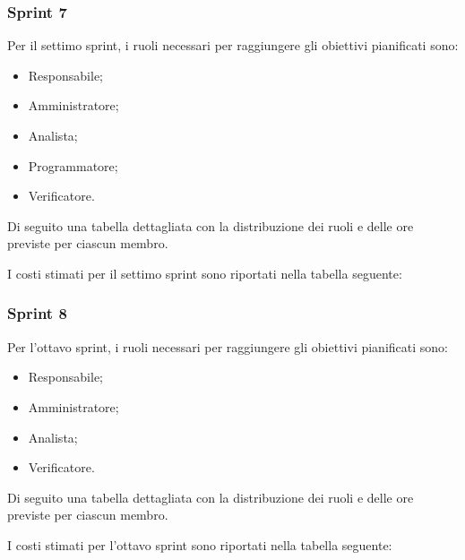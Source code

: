 
\pagebreak 
\subsubsection{Sprint 7}

Per il settimo sprint, i ruoli necessari per raggiungere gli obiettivi
pianificati sono:
\begin{itemize}
    \item Responsabile;
    \item Amministratore;
    \item Analista;
    \item Programmatore;
    \item Verificatore.
\end{itemize}


Di seguito una tabella dettagliata con la distribuzione dei ruoli e delle ore previste per ciascun membro.



I costi stimati per il settimo sprint sono riportati nella tabella seguente:



\pagebreak 
\subsubsection{Sprint 8}

Per l'ottavo sprint, i ruoli necessari per raggiungere gli obiettivi
pianificati sono:
\begin{itemize}
    \item Responsabile;
    \item Amministratore;
    \item Analista;
    \item Verificatore.
\end{itemize}


Di seguito una tabella dettagliata con la distribuzione dei ruoli e delle ore previste per ciascun membro.



I costi stimati per l'ottavo sprint sono riportati nella tabella seguente:



\pagebreak
